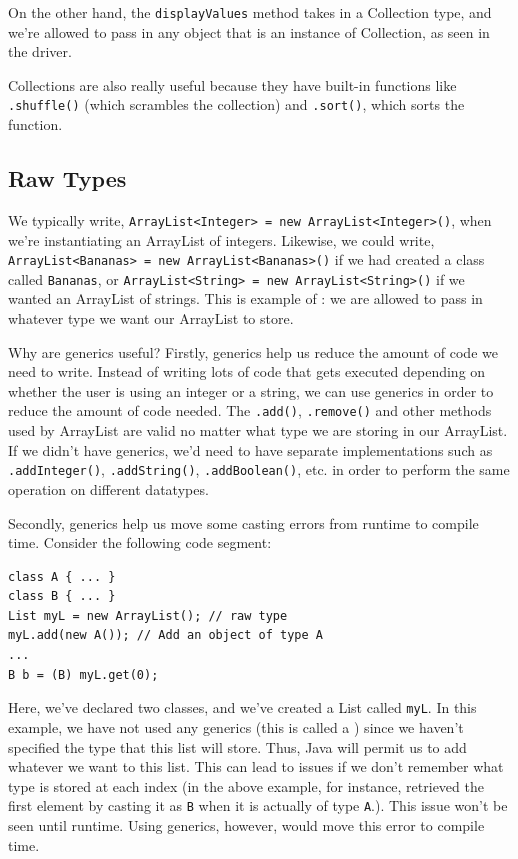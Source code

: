 On the other hand, the \verb!displayValues! method takes in a Collection type, and we're allowed to pass in any object that is an instance of Collection, as seen in the driver. 


Collections are also really useful because they have built-in functions like \verb!.shuffle()! (which scrambles the collection) and \verb!.sort()!, which sorts the function. 

\subsection{Raw Types}

We typically write, \verb!ArrayList<Integer> = new ArrayList<Integer>()!, when we're instantiating an ArrayList of integers. Likewise, we could write, \verb!ArrayList<Bananas> = new ArrayList<Bananas>()! if we had created a class called \verb!Bananas!, or \verb!ArrayList<String> = new ArrayList<String>()! if we wanted an ArrayList of strings. This is example of : we are allowed to pass in whatever type we want our ArrayList to store. 


Why are generics useful? Firstly, generics help us reduce the amount of code we need to write. Instead of writing lots of code that gets executed depending on whether the user is using an integer or a string, we can use generics in order to reduce the amount of code needed. The \verb!.add()!, \verb!.remove()! and other methods used by ArrayList are valid no matter what type we are storing in our ArrayList. If we didn't have generics, we'd need to have separate implementations such as \verb!.addInteger()!, \verb!.addString()!, \verb!.addBoolean()!, etc. in order to perform the same operation on different datatypes.

Secondly, generics help us move some casting errors from runtime to compile time. Consider the following code segment:

\begin{lstlisting}
class A { ... }
class B { ... }
List myL = new ArrayList(); // raw type
myL.add(new A()); // Add an object of type A
...
B b = (B) myL.get(0);
\end{lstlisting}

Here, we've declared two classes, and we've created a List called \verb!myL!. In this example, we have not used any generics (this is called a ) since we haven't specified the type that this list will store. Thus, Java will permit us to add whatever we want to this list. This can lead to issues if we don't remember what type is stored at each index (in the above example, for instance, retrieved the first element by casting it as \verb!B! when it is actually of type \verb!A!.). This issue won't be seen until runtime. Using generics, however, would move this error to compile time.

